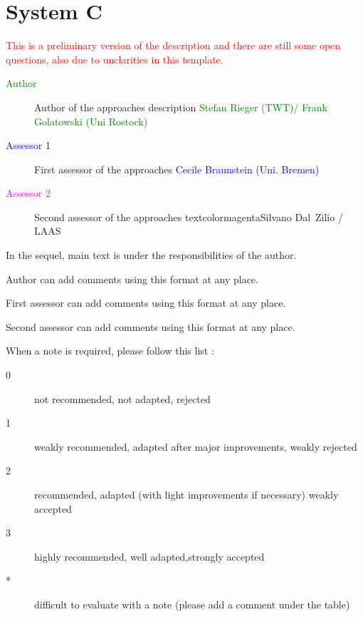 
\chapter{System C}

\textcolor{red}{
This is a preliminary version of the description and there are still some open questions, also due to unclarities in this template.
}

\begin{description}
\item[\textcolor{green}{Author}] Author of the approaches description \textcolor{green}{Stefan Rieger (TWT)/ Frank Golatowski (Uni Rostock)}
\item[\textcolor{blue}{Assessor 1}] First assessor of the approaches \textcolor{blue}{Cecile Braunstein (Uni. Bremen)}
\item[\textcolor{magenta}{Assessor 2}] Second assessor of the approaches textcolor{magenta}{Silvano Dal~Zilio / LAAS}
\end{description}

In the sequel, main text is under the responsibilities of the author.

\begin{author_comment}
Author can add comments using this format at any place.
\end{author_comment}

\begin{assessor1}
First assessor can add comments using this format at any place.
\end{assessor1}

\begin{assessor2}
Second assessor can add comments using this format at any place.
\end{assessor2}

When a note is required, please follow this list :
\begin{description}
\item[0] not recommended, not adapted, rejected
\item[1] weakly recommended, adapted after major improvements, weakly rejected
\item[2] recommended, adapted (with light improvements if necessary) weakly accepted
\item[3] highly recommended, well adapted,strongly accepted
\item[*] difficult to evaluate with a note (please add a comment under the table)
\end{description}

